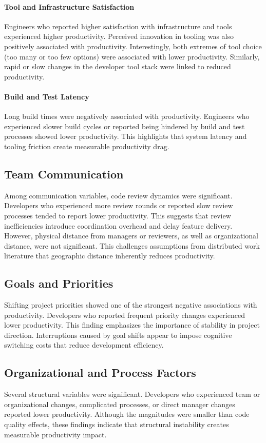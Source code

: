 \paragraph{Tool and Infrastructure Satisfaction}
Engineers who reported higher satisfaction with infrastructure and tools experienced higher productivity. Perceived innovation in tooling was also positively associated with productivity. Interestingly, both extremes of tool choice (too many or too few options) were associated with lower productivity. Similarly, rapid or slow changes in the developer tool stack were linked to reduced productivity.

\paragraph{Build and Test Latency}
Long build times were negatively associated with productivity. Engineers who experienced slower build cycles or reported being hindered by build and test processes showed lower productivity. This highlights that system latency and tooling friction create measurable productivity drag.

\subsection{Team Communication}
Among communication variables, code review dynamics were significant. Developers who experienced more review rounds or reported slow review processes tended to report lower productivity. This suggests that review inefficiencies introduce coordination overhead and delay feature delivery. However, physical distance from managers or reviewers, as well as organizational distance, were not significant. This challenges assumptions from distributed work literature that geographic distance inherently reduces productivity.

\subsection{Goals and Priorities}
Shifting project priorities showed one of the strongest negative associations with productivity. Developers who reported frequent priority changes experienced lower productivity. This finding emphasizes the importance of stability in project direction. Interruptions caused by goal shifts appear to impose cognitive switching costs that reduce development efficiency.

\subsection{Organizational and Process Factors}
Several structural variables were significant. Developers who experienced team or organizational changes, complicated processes, or direct manager changes reported lower productivity. Although the magnitudes were smaller than code quality effects, these findings indicate that structural instability creates measurable productivity impact.

